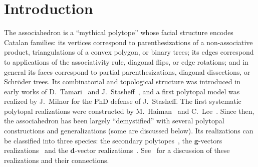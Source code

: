 \documentclass{amsart}
\theoremstyle{definition}
\renewcommand{\b}[1]{{\boldsymbol{#1}}} %
\begin{document}
\newpage
\tableofcontents

\newpage
\section*{Introduction}

The associahedron is a ``mythical polytope'' \cite{Haiman} whose facial structure encodes Catalan families: its vertices correspond to parenthesizations of a non-associative product, triangulations of a convex polygon, or binary trees; its edges correspond to applications of the associativity rule, diagonal flips, or edge rotations; and in general its faces correspond to partial parenthesizations, diagonal dissections, or Schr\"oder trees.
Its combinatorial and topological structure was introduced in early works of D.~Tamari~\cite{Tamari} and J.~Stasheff~\cite{Stasheff}, and a first polytopal model was realized by J.~Milnor for the PhD defense of J.~Stasheff.
The first systematic polytopal realizations were constructed by M.~Haiman~\cite{Haiman} and C.~Lee~\cite{Lee}.
Since then, the associahedron has been largely ``demystified'' with several polytopal constructions and generalizations (some are discussed below).
Its realizations can be classified into three species: the secondary polytopes~\cite{GelfandKapranovZelevinsky, BilleraFillimanSturmfels}, the $\b{g}$-vectors realizations~\cite{Loday, HohlwegLange, LangePilaud, HohlwegLangeThomas, HohlwegPilaudStella, Postnikov, PilaudSantos-brickPolytope, PilaudStump-brickPolytope} and the $\b{d}$-vector realizations~\cite{ChapotonFominZelevinsky, CeballosSantosZiegler}. See~\cite{CeballosSantosZiegler} for a discussion of these realizations and their connections.
\end{document}

